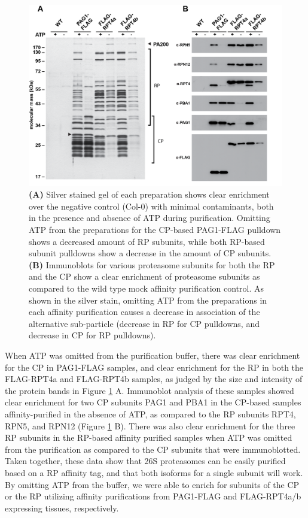  \begin{figure}[p]
	\centering
	\includegraphics[width=\columnwidth]{Proteasome/purification.png}
	{\textbf{(A)} Silver stained gel of each preparation shows clear enrichment over the negative control (Col-0) with minimal contaminants, both in the presence and absence of ATP during purification. Omitting ATP from the preparations for the CP-based PAG1-FLAG pulldown shows a decreased amount of RP subunits, while both RP-based subunit pulldowns show a decrease in the amount of CP subunits. \textbf{(B)} Immunoblots for various proteasome subunits for both the RP and the CP show a clear enrichment of proteasome subunits as compared to the wild type mock affinity purification control.  As shown in the silver stain, omitting ATP from the preparations in each affinity purification causes a decrease in association of the alternative sub-particle (decrease in RP for CP pulldowns, and decrease in CP for RP pulldowns).}
	\label{fig:purification}
\end{figure}	
	When ATP was omitted from the purification buffer, there was clear enrichment for the CP in PAG1-FLAG samples, and clear enrichment for the RP in both the FLAG-RPT4a and FLAG-RPT4b samples, as judged by the size and intensity of the protein bands in Figure \ref{fig:purification} A. Immunoblot analysis of these samples showed clear enrichment for two CP subunits PAG1 and PBA1 in the CP-based samples affinity-purified in the absence of ATP, as compared to the RP subunits RPT4, RPN5, and RPN12 (Figure \ref{fig:purification} B). There was also clear enrichment for the three RP subunits in the RP-based affinity purified samples when ATP was omitted from the purification as compared to the CP subunits that were immunoblotted.  Taken together, these data show that 26S proteasomes can be easily purified based on a RP affinity tag, and that both isoforms for a single subunit will work. By omitting ATP from the buffer, we were able to enrich for subunits of the CP or the RP utilizing affinity purifications from PAG1-FLAG and FLAG-RPT4a/b expressing tissues, respectively. 

